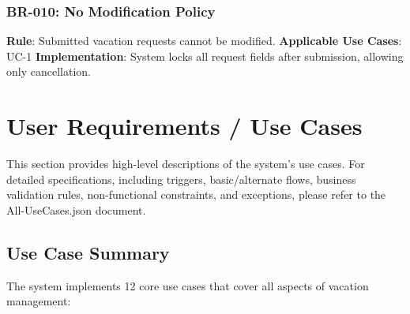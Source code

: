 \documentclass[12pt,a4paper]{article}
\begin{document}
\subsubsection{BR-010: No Modification Policy}
\textbf{Rule}: Submitted vacation requests cannot be modified.
\textbf{Applicable Use Cases}: UC-1
\textbf{Implementation}: System locks all request fields after submission, allowing only cancellation.



\section{User Requirements / Use Cases}

This section provides high-level descriptions of the system's use cases. For detailed specifications, including triggers, basic/alternate flows, business validation rules, non-functional constraints, and exceptions, please refer to the All-UseCases.json document.

\subsection{Use Case Summary}
The system implements 12 core use cases that cover all aspects of vacation management:
\end{document}
